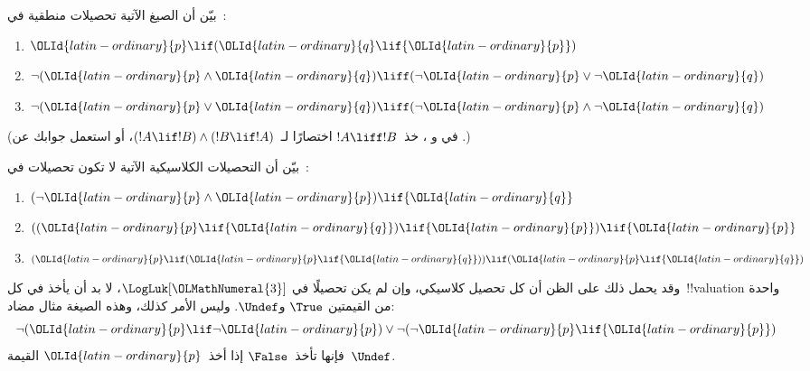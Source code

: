 \documentclass[../../../include/open-logic-section]{subfiles}
\begin{document}
\begin{prob}
  بيّن أن الصيغ الآتية تحصيلات منطقية في~\LogLuk[\OLClassicalDigits{3}]:
  \begin{enumerate}
    \item ${\OLId{latin-ordinary}{p}} \lif ({\OLId{latin-ordinary}{q}} \lif {\OLId{latin-ordinary}{p}})$
    \item\label{mvl:thr:luk:prob:luk-taut-2} $\lnot({\OLId{latin-ordinary}{p}} \land {\OLId{latin-ordinary}{q}}) \liff (\lnot {\OLId{latin-ordinary}{p}} \lor \lnot {\OLId{latin-ordinary}{q}})$
    \item\label{mvl:thr:luk:prob:luk-taut-3} $\lnot({\OLId{latin-ordinary}{p}} \lor {\OLId{latin-ordinary}{q}}) \liff (\lnot {\OLId{latin-ordinary}{p}} \land \lnot {\OLId{latin-ordinary}{q}})$
  \end{enumerate}
  (في  و
  ، خذ~$!A \liff !B$
  اختصارًا لـ~$(!A \lif !B) \land (!B \lif !A)$، أو استعمل جوابك
  عن .)
\end{prob}

\begin{prob}
  بيّن أن التحصيلات الكلاسيكية الآتية لا تكون تحصيلات في~\LogLuk[\OLClassicalDigits{3}]:
  \begin{enumerate}
    \item $(\lnot {\OLId{latin-ordinary}{p}} \land {\OLId{latin-ordinary}{p}}) \lif {\OLId{latin-ordinary}{q}}$
    \item $(({\OLId{latin-ordinary}{p}} \lif {\OLId{latin-ordinary}{q}}) \lif {\OLId{latin-ordinary}{p}}) \lif {\OLId{latin-ordinary}{p}}$
    \item $({\OLId{latin-ordinary}{p}} \lif ({\OLId{latin-ordinary}{p}} \lif {\OLId{latin-ordinary}{q}})) \lif ({\OLId{latin-ordinary}{p}} \lif {\OLId{latin-ordinary}{q}})$
  \end{enumerate}
\end{prob}

وقد يحمل ذلك على الظن أن كل تحصيل كلاسيكي، وإن لم يكن تحصيلًا في
$\LogLuk[{\OLMathNumeral{3}}]$، لا بد أن يأخذ في كل~!!{valuation} واحدة من القيمتين
$\True$ و$\Undef$. وليس الأمر كذلك، وهذه الصيغة مثال مضاد:
\[
  \lnot({\OLId{latin-ordinary}{p}} \lif \lnot {\OLId{latin-ordinary}{p}}) \lor \lnot(\lnot {\OLId{latin-ordinary}{p}} \lif {\OLId{latin-ordinary}{p}})
\]
فإنها تأخذ~$\False$ إذا أخذ~${\OLId{latin-ordinary}{p}}$ القيمة~$\Undef$.
\end{document}
